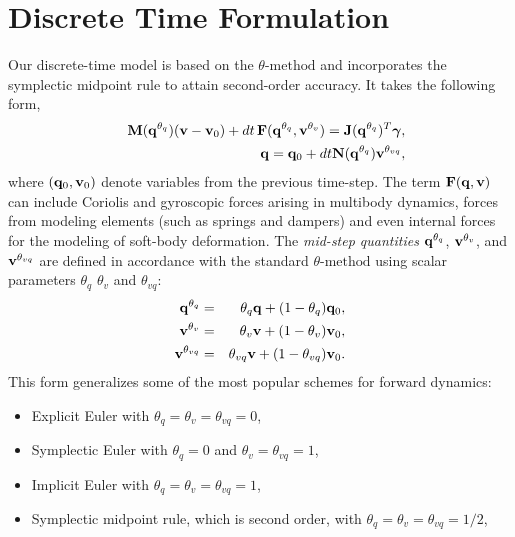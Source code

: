 \section{Discrete Time Formulation}
Our discrete-time model is based on the $\theta\text{-method}$  and incorporates the symplectic midpoint rule to attain
second-order accuracy. It takes the following form, 
\begin{eqnarray}
	&&\mf{M}(\mf{q}^{\theta_{q}})(\mf{v}-\mf{v}_0) +
	dt\,\mf{F}(\mf{q}^{\theta_{q}}, \mf{v}^{\theta_v}) =
	\mf{J}(\mf{q}^{\theta_{q}})^T\mf{\bgamma}, \label{eq:v_update}\\
	&&\mf{q} = \mf{q}_0 + dt\mf{N}(\mf{q}^{\theta_{q}})\mf{v}^{\theta_{vq}},
	\label{eq:q_update}
\end{eqnarray}
where $({\mathbf{q}}_0, {\mathbf{v}}_0)$ denote variables from the previous time-step. The
term ${\mathbf{F}}({\mathbf{q}}, {\mathbf{v}})$ can include Coriolis and gyroscopic forces arising
in multibody dynamics, forces from modeling elements (such as springs and
dampers) and even internal forces for the modeling of soft-body deformation. The
\emph{mid-step quantities} ${\mathbf{q}}^{\theta_{q}}$, ${\mathbf{v}}^{\theta_{v}}$, and
${\mathbf{v}}^{\theta_{vq}}$ are defined in accordance with the standard
$\theta\text{-method}$ using scalar parameters $\theta_q$ $\theta_v$ and
$\theta_{vq}$:
\begin{eqnarray*}
	{\mathbf{q}}^{\theta_q} &=& \theta_q{\mathbf{q}} + (1-\theta_{q}){\mathbf{q}}_0,\\
	{\mathbf{v}}^{\theta_v} &=& \theta_v{\mathbf{v}} + (1-\theta_v){\mathbf{v}}_0,\\
	{\mathbf{v}}^{\theta_{vq}} &=& \theta_{vq}{\mathbf{v}} + (1-\theta_{vq}){\mathbf{v}}_0.
\end{eqnarray*}
This form generalizes some of the most popular schemes for forward dynamics:
\begin{itemize}
	\item Explicit Euler with $\theta_q=\theta_{v}=\theta_{vq} = 0$,
	\item Symplectic Euler with $\theta_{q} = 0$ and $\theta_v = \theta_{vq}=1$,
	\item Implicit Euler with $\theta_{q} = \theta_v = \theta_{vq}= 1$,
	\item Symplectic midpoint rule, which is second order, with $\theta_{q} =
	\theta_v = \theta_{vq}= 1/2$,
\end{itemize}

